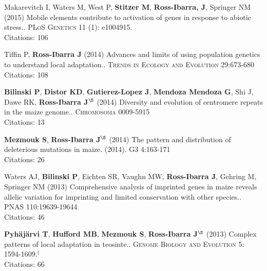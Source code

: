 \documentclass[letterpaper,10pt]{article}
\begin{document}
\begin{etaremune}
\item Makarevitch I, Waters M, West P, {\bf Stitzer M}, {\bf Ross-Ibarra, J}, Springer NM (2015) Mobile elements contribute to activation of genes in response to abiotic stress.. \textsc{PLoS Genetics} 11 (1): e1004915. %
\\Citations: 106\\


\item Tiffin P, {\bf Ross-Ibarra J} (2014) Advances and limits of using population genetics to understand local adaptation.. \textsc{Trends in Ecology and Evolution} 29:673-680 %
\\Citations: 108\\


\item {\bf Bilinski P}, {\bf Distor KD}, {\bf Gutierez-Lopez J}, {\bf Mendoza Mendoza G}, Shi J, Dawe RK,  {\bf Ross-Ibarra J}$^\S$ (2014) Diversity and evolution of centromere repeats in the maize genome.. \textsc{Chromosoma} 0009-5915
\\Citations: 13\\

\item {\bf Mezmouk S}, {\bf Ross-Ibarra J}$^\S$ (2014) The pattern and distribution of deleterious mutations in maize. (2014). \textsc{G3} 4:163-171
\\Citations: 26\\

\item Waters AJ, {\bf Bilinski P}, Eichten SR, Vaughn MW, {\bf Ross-Ibarra J}, Gehring M, Springer NM (2013) Comprehensive analysis of imprinted genes in maize reveals allelic variation for imprinting and limited conservation with other species.. \textsc{PNAS} 110:19639-19644
\\Citations: 46\\


\item {\bf Pyh\"aj\"arvi T}, {\bf Hufford MB}, {\bf Mezmouk S}, {\bf Ross-Ibarra J}$^\S$ (2013) Complex patterns of local adaptation in teosinte.. \textsc{Genome Biology and Evolution} 5: 1594-1609.$^\dagger$
\\Citations: 66\\



\end{etaremune}
\end{document}
